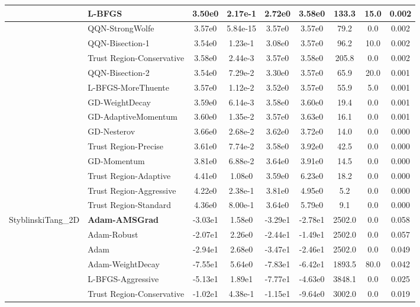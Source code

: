 \documentclass{article}
\begin{document}
\begin{longtable}{|l|l|c|c|c|c|c|c|c|}
\hline
 & L-BFGS & 3.50e0 & 2.17e-1 & 2.72e0 & 3.58e0 & 133.3 & 15.0 & 0.002 \\
\hline
 & QQN-StrongWolfe & 3.57e0 & 5.84e-15 & 3.57e0 & 3.57e0 & 79.2 & 0.0 & 0.002 \\
\hline
 & QQN-Bisection-1 & 3.54e0 & 1.23e-1 & 3.08e0 & 3.57e0 & 96.2 & 10.0 & 0.002 \\
\hline
 & Trust Region-Conservative & 3.58e0 & 2.44e-3 & 3.57e0 & 3.58e0 & 205.8 & 0.0 & 0.002 \\
\hline
 & QQN-Bisection-2 & 3.54e0 & 7.29e-2 & 3.30e0 & 3.57e0 & 65.9 & 20.0 & 0.001 \\
\hline
 & L-BFGS-MoreThuente & 3.57e0 & 1.12e-2 & 3.52e0 & 3.57e0 & 55.9 & 5.0 & 0.001 \\
\hline
 & GD-WeightDecay & 3.59e0 & 6.14e-3 & 3.58e0 & 3.60e0 & 19.4 & 0.0 & 0.001 \\
\hline
 & GD-AdaptiveMomentum & 3.60e0 & 1.35e-2 & 3.57e0 & 3.63e0 & 16.1 & 0.0 & 0.001 \\
\hline
 & GD-Nesterov & 3.66e0 & 2.68e-2 & 3.62e0 & 3.72e0 & 14.0 & 0.0 & 0.000 \\
\hline
 & Trust Region-Precise & 3.61e0 & 7.74e-2 & 3.58e0 & 3.92e0 & 42.5 & 0.0 & 0.000 \\
\hline
 & GD-Momentum & 3.81e0 & 6.88e-2 & 3.64e0 & 3.91e0 & 14.5 & 0.0 & 0.000 \\
\hline
 & Trust Region-Adaptive & 4.41e0 & 1.08e0 & 3.59e0 & 6.23e0 & 18.2 & 0.0 & 0.000 \\
\hline
 & Trust Region-Aggressive & 4.22e0 & 2.38e-1 & 3.81e0 & 4.95e0 & 5.2 & 0.0 & 0.000 \\
\hline
 & Trust Region-Standard & 4.36e0 & 8.00e-1 & 3.64e0 & 5.79e0 & 9.1 & 0.0 & 0.000 \\
StyblinskiTang\_2D & \textbf{Adam-AMSGrad} & -3.03e1 & 1.58e0 & -3.29e1 & -2.78e1 & 2502.0 & 0.0 & 0.058 \\
\hline
 & Adam-Robust & -2.07e1 & 2.26e0 & -2.44e1 & -1.49e1 & 2502.0 & 0.0 & 0.057 \\
\hline
 & Adam & -2.94e1 & 2.68e0 & -3.47e1 & -2.46e1 & 2502.0 & 0.0 & 0.049 \\
\hline
 & Adam-WeightDecay & -7.55e1 & 5.64e0 & -7.83e1 & -6.42e1 & 1893.5 & 80.0 & 0.042 \\
\hline
 & L-BFGS-Aggressive & -5.13e1 & 1.89e1 & -7.77e1 & -4.63e0 & 3848.1 & 0.0 & 0.025 \\
\hline
 & Trust Region-Conservative & -1.02e1 & 4.38e-1 & -1.15e1 & -9.64e0 & 3002.0 & 0.0 & 0.019 \\

\end{longtable}
\end{document}
